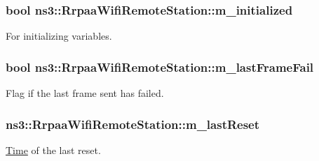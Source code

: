 \subsubsection[{\texorpdfstring{m\+\_\+initialized}{m_initialized}}]{\setlength{\rightskip}{0pt plus 5cm}bool ns3\+::\+Rrpaa\+Wifi\+Remote\+Station\+::m\+\_\+initialized}\hypertarget{structns3_1_1RrpaaWifiRemoteStation_a28f5b71d7c9a1b1d35b8763273e2c527}{}\label{structns3_1_1RrpaaWifiRemoteStation_a28f5b71d7c9a1b1d35b8763273e2c527}


For initializing variables. 

\subsubsection[{\texorpdfstring{m\+\_\+last\+Frame\+Fail}{m_lastFrameFail}}]{\setlength{\rightskip}{0pt plus 5cm}bool ns3\+::\+Rrpaa\+Wifi\+Remote\+Station\+::m\+\_\+last\+Frame\+Fail}\hypertarget{structns3_1_1RrpaaWifiRemoteStation_ac3e75c02498f6e4f05e4cbc8d038b2e0}{}\label{structns3_1_1RrpaaWifiRemoteStation_ac3e75c02498f6e4f05e4cbc8d038b2e0}


Flag if the last frame sent has failed. 

\subsubsection[{\texorpdfstring{m\+\_\+last\+Reset}{m_lastReset}}]{ ns3\+::\+Rrpaa\+Wifi\+Remote\+Station\+::m\+\_\+last\+Reset}\hypertarget{structns3_1_1RrpaaWifiRemoteStation_aa90b3541302d0aacf06c97cee380f2d7}{}\label{structns3_1_1RrpaaWifiRemoteStation_aa90b3541302d0aacf06c97cee380f2d7}


\hyperlink{classns3_1_1Time}{Time} of the last reset. 

